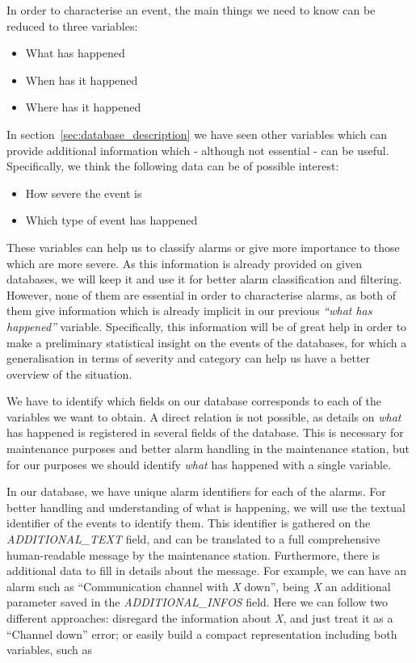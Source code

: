 \documentclass[a4paper,12pt]{article}
\begin{document}
In order to characterise an event, the main things we need to know can be reduced to three variables:
\begin{itemize}
\item What has happened
\item When has it happened
\item Where has it happened
\end{itemize}

In section~\ref{sec:database_description} we have seen other variables which can provide additional information which - although not essential - can be useful. Specifically, we think the following data can be of possible interest:

\begin{itemize}
\item How severe the event is
\item Which type of event has happened
\end{itemize}

These variables can help us to classify alarms or give more importance to those which are more severe. As this information is already provided on given databases, we will keep it and use it for better alarm classification and filtering. However, none of them are essential in order to characterise alarms, as both of them give information which is already implicit in our previous \emph{``what has happened''} variable. Specifically, this information will be of great help in order to make a preliminary statistical insight on the events of the databases, for which a generalisation in terms of severity and category can help us have a better overview of the situation.

We have to identify which fields on our database corresponds to each of the variables we want to obtain. A direct relation is not possible, as details on \emph{what} has happened is registered in several fields of the database. This is necessary for maintenance purposes and better alarm handling in the maintenance station, but for our purposes we should identify \emph{what} has happened with a single variable.

In our database, we have unique alarm identifiers for each of the alarms. For better handling and understanding of what is happening, we will use the textual identifier of the events to identify them. This identifier is gathered on the \emph{ADDITIONAL\_TEXT} field, and can be translated to a full comprehensive human-readable message by the maintenance station. Furthermore, there is additional data to fill in details about the message. For example, we can have an alarm such as ``Communication channel with \emph{X} down'', being \emph{X} an additional parameter saved in the \emph{ADDITIONAL\_INFOS} field. Here we can follow two different approaches: disregard the information about \emph{X}, and just treat it as a ``Channel down'' error; or easily build a compact representation including both variables, such as
\end{document}
